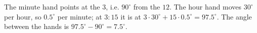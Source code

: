 The minute hand points at the $3$, i.e. $90^\circ$ from the $12$. The hour hand moves $30^\circ$ per hour, so $0.5^\circ$ per minute; at $3{:}15$ it is at $3\cdot30^\circ+15\cdot0.5^\circ=97.5^\circ$. The angle between the hands is $97.5^\circ-90^\circ=\boxed{7.5^\circ}$.
